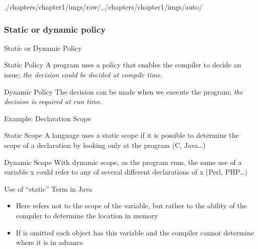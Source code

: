 \begin{graphicspathcontext}{{./chapters/chapter1/imgs/raw/},{./chapters/chapter1/imgs/auto/}}
\begin{bibunit}[apalike]
\subsubsection{Static or dynamic policy}
\begin{frame}{Static or Dynamic Policy}
	\vspace{1cm}
	\begin{definitionblock}{Static Policy}
	A program uses a policy that enables the compiler to decide an issue; \emph{the decision could be decided at compile time.}
	\end{definitionblock}
	\vspace{.5cm}
	\begin{definitionblock}{Dynamic Policy}
	The decision can be made when we execute the program; \emph{the decision is required at run time.}
	\end{definitionblock}
\end{frame}

\begin{frame}{Example: Declaration Scope}
	\begin{definitionblock}{Static Scope}
		A language uses a static scope if it is possible to determine the scope of a declaration by looking only at the program (C, Java\dots)
	\end{definitionblock}
	\vspace{1cm}
	\begin{definitionblock}{Dynamic Scope}
		With dynamic scope, as the program runs, the same use of a variable x could refer to any of several different declarations of x (Perl, PHP\dots)
	\end{definitionblock}
\end{frame}

\begin{frame}[background=6]{{Use of ``static'' Term} in Java}
	\begin{center}
	\end{center}
	\vfill
	\begin{itemize}
	\item Here  refers not to the scope of the variable, but rather to the ability of the compiler to determine the location in memory
	\vfill
	\item If  is omitted each object has this variable and the compiler cannot determine where it is in advance
	\end{itemize}
\end{frame}


\end{bibunit}
\end{graphicspathcontext}
